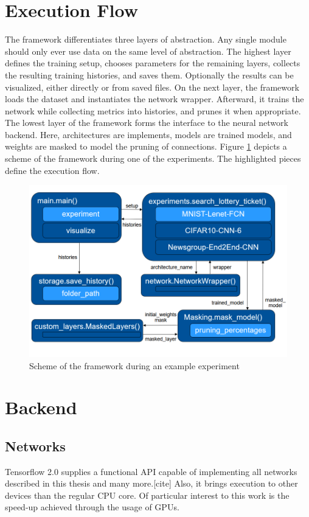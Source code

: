 \section{Execution Flow}
The framework differentiates three layers of abstraction. Any single module should only ever use data on the same level of abstraction.
The highest layer defines the training setup, chooses parameters for the remaining layers, collects the resulting training histories, and saves them. Optionally the results can be visualized, either directly or from saved files. 
On the next layer, the framework loads the dataset and instantiates the network wrapper. Afterward, it trains the network while collecting metrics into histories, and prunes it when appropriate.
The lowest layer of the framework forms the interface to the neural network backend. Here, architectures are implements, models are trained models, and weights are masked to model the pruning of connections.
Figure \ref{fig:Example Control Flow} depicts a scheme of the framework during one of the experiments. The highlighted pieces define the execution flow.
\begin{figure}
	\centering
	\includegraphics[width=450px]{gfx/chp_5_control_flow.png}
	\caption{Scheme of the framework during an example experiment}
	\label{fig:Example Control Flow}
\end{figure}

\section{Backend}
\subsection{Networks}
Tensorflow 2.0 supplies a functional API capable of implementing all networks described in this thesis and many more.[cite] Also, it brings execution to other devices than the regular CPU core. Of particular interest to this work is the speed-up achieved through the usage of GPUs. 
